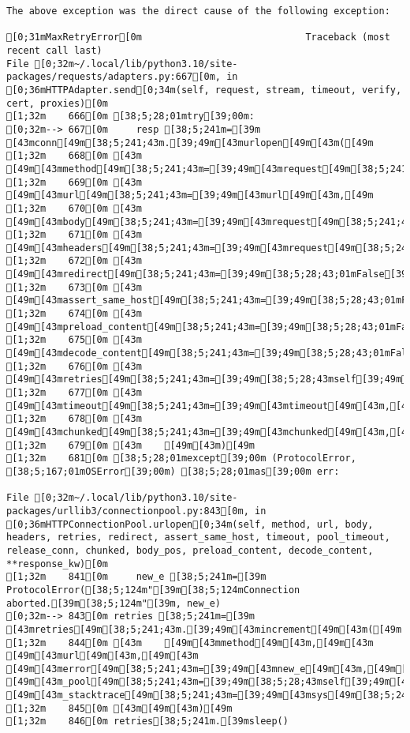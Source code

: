 \documentclass[
  a4paper,
  portrait]{book}
\begin{document}
\begin{verbatim}
The above exception was the direct cause of the following exception:

[0;31mMaxRetryError[0m                             Traceback (most recent call last)
File [0;32m~/.local/lib/python3.10/site-packages/requests/adapters.py:667[0m, in [0;36mHTTPAdapter.send[0;34m(self, request, stream, timeout, verify, cert, proxies)[0m
[1;32m    666[0m [38;5;28;01mtry[39;00m:
[0;32m--> 667[0m     resp [38;5;241m=[39m [43mconn[49m[38;5;241;43m.[39;49m[43murlopen[49m[43m([49m
[1;32m    668[0m [43m        [49m[43mmethod[49m[38;5;241;43m=[39;49m[43mrequest[49m[38;5;241;43m.[39;49m[43mmethod[49m[43m,[49m
[1;32m    669[0m [43m        [49m[43murl[49m[38;5;241;43m=[39;49m[43murl[49m[43m,[49m
[1;32m    670[0m [43m        [49m[43mbody[49m[38;5;241;43m=[39;49m[43mrequest[49m[38;5;241;43m.[39;49m[43mbody[49m[43m,[49m
[1;32m    671[0m [43m        [49m[43mheaders[49m[38;5;241;43m=[39;49m[43mrequest[49m[38;5;241;43m.[39;49m[43mheaders[49m[43m,[49m
[1;32m    672[0m [43m        [49m[43mredirect[49m[38;5;241;43m=[39;49m[38;5;28;43;01mFalse[39;49;00m[43m,[49m
[1;32m    673[0m [43m        [49m[43massert_same_host[49m[38;5;241;43m=[39;49m[38;5;28;43;01mFalse[39;49;00m[43m,[49m
[1;32m    674[0m [43m        [49m[43mpreload_content[49m[38;5;241;43m=[39;49m[38;5;28;43;01mFalse[39;49;00m[43m,[49m
[1;32m    675[0m [43m        [49m[43mdecode_content[49m[38;5;241;43m=[39;49m[38;5;28;43;01mFalse[39;49;00m[43m,[49m
[1;32m    676[0m [43m        [49m[43mretries[49m[38;5;241;43m=[39;49m[38;5;28;43mself[39;49m[38;5;241;43m.[39;49m[43mmax_retries[49m[43m,[49m
[1;32m    677[0m [43m        [49m[43mtimeout[49m[38;5;241;43m=[39;49m[43mtimeout[49m[43m,[49m
[1;32m    678[0m [43m        [49m[43mchunked[49m[38;5;241;43m=[39;49m[43mchunked[49m[43m,[49m
[1;32m    679[0m [43m    [49m[43m)[49m
[1;32m    681[0m [38;5;28;01mexcept[39;00m (ProtocolError, [38;5;167;01mOSError[39;00m) [38;5;28;01mas[39;00m err:

File [0;32m~/.local/lib/python3.10/site-packages/urllib3/connectionpool.py:843[0m, in [0;36mHTTPConnectionPool.urlopen[0;34m(self, method, url, body, headers, retries, redirect, assert_same_host, timeout, pool_timeout, release_conn, chunked, body_pos, preload_content, decode_content, **response_kw)[0m
[1;32m    841[0m     new_e [38;5;241m=[39m ProtocolError([38;5;124m"[39m[38;5;124mConnection aborted.[39m[38;5;124m"[39m, new_e)
[0;32m--> 843[0m retries [38;5;241m=[39m [43mretries[49m[38;5;241;43m.[39;49m[43mincrement[49m[43m([49m
[1;32m    844[0m [43m    [49m[43mmethod[49m[43m,[49m[43m [49m[43murl[49m[43m,[49m[43m [49m[43merror[49m[38;5;241;43m=[39;49m[43mnew_e[49m[43m,[49m[43m [49m[43m_pool[49m[38;5;241;43m=[39;49m[38;5;28;43mself[39;49m[43m,[49m[43m [49m[43m_stacktrace[49m[38;5;241;43m=[39;49m[43msys[49m[38;5;241;43m.[39;49m[43mexc_info[49m[43m([49m[43m)[49m[43m[[49m[38;5;241;43m2[39;49m[43m][49m
[1;32m    845[0m [43m[49m[43m)[49m
[1;32m    846[0m retries[38;5;241m.[39msleep()


\end{verbatim}
\end{document}
